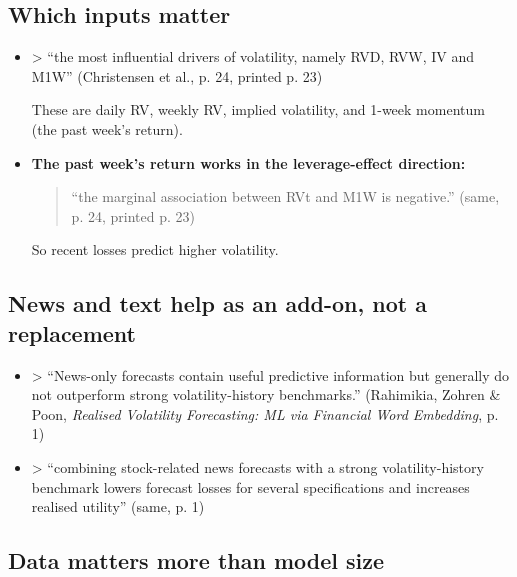 \documentclass{article}
\begin{document}
\subsection{Which inputs matter}

\begin{itemize}

\item

> ``the most influential drivers of volatility, namely RVD, RVW, IV and M1W'' (Christensen et al., p. 24, printed p. 23)

These are daily RV, weekly RV, implied volatility, and 1-week momentum (the past week's return).

\item \textbf{The past week's return works in the leverage-effect direction:}

\begin{quote}``the marginal association between RVt and M1W is negative.'' (same, p. 24, printed p. 23)\end{quote}

So recent losses predict higher volatility.

\end{itemize}

\subsection{News and text help as an add-on, not a replacement}

\begin{itemize}

\item

> ``News-only forecasts contain useful predictive information but generally do not outperform strong volatility-history benchmarks.'' (Rahimikia, Zohren \& Poon, \emph{Realised Volatility Forecasting: ML via Financial Word Embedding}, p. 1)

\item

> ``combining stock-related news forecasts with a strong volatility-history benchmark lowers forecast losses for several specifications and increases realised utility'' (same, p. 1)

\end{itemize}

\subsection{Data matters more than model size}
\end{document}
